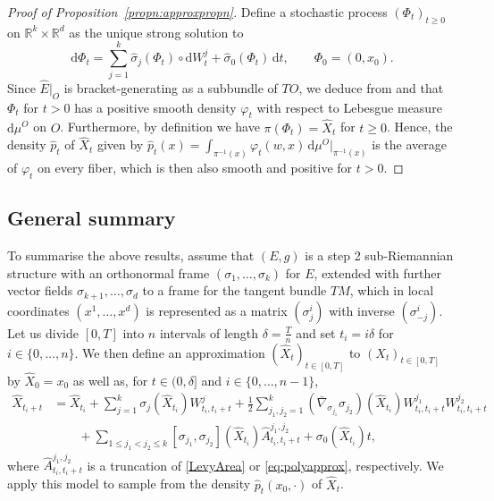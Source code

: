 \documentclass[10pt]{amsart}
\theoremstyle{remark}
\newcommand{\R}{\mathbb{R}}
\newcommand{\dd}{\,{\mathrm d}}
\newcommand{\db}{{\mathrm d}}
\numberwithin{equation}{section}
\begin{document}
\begin{proof}[Proof of Proposition~\ref{propn:approxpropn}]
Define a stochastic process $(\Phi_t)_{t\geq 0}$ on $\R^k\times\R^d$ as the unique strong solution to
$$\db\Phi_t = \sum_{j=1}^k \hat \sigma_j(\Phi_t) \circ \db W_t^j + \hat \sigma_0(\Phi_t) \dd t,\qquad \Phi_0 =(0,x_0).$$
Since $\hat E|_O$ is bracket-generating as a subbundle of $TO$, we deduce from \cite{Hor67} and \cite{StVa72} that $\Phi_t$ for $t>0$ has a positive smooth density $\varphi_t$ with respect to Lebesgue measure $\db \mu^O$ on $O$.
Furthermore, by definition we have $\pi(\Phi_t) = \hat X_t$ for $t\geq 0$. Hence, the density
$\hat p_t$ of $\hat X_t$ given by
$\hat p_t(x) = \int_{\pi^{-1}(x)} \varphi_t(w,x) \dd \mu^O|_{\pi^{-1}(x)}$ is the average of $\varphi_t$ on every fiber, which is then also smooth and positive for $t>0$.
\end{proof}

\subsection{General summary}
To summarise the above results, assume that $(E,g)$ is a step 2 sub-Riemannian structure with an orthonormal frame $(\sigma_1, \dots, \sigma_k)$ for $E$, extended with further vector fields $\sigma_{k+1}, \dots, \sigma_{d}$ to a frame for the tangent bundle $TM$, which in local coordinates $(x^1, \dots, x^d)$ is represented as a matrix $(\sigma^i_j)$ with inverse $(\sigma_{-j}^i)$. Let us divide $[0,T]$ into $n$ intervals of length $\delta = \frac{T}{n}$ and set $t_i = i \delta$ for $i\in\{0,\dots,n\}$. We then define an approximation $(\hat X_t)_{t\in[0,T]}$ to $(X_t)_{t\in[0,T]}$ by $\hat X_0 = x_0$ as well as, for $t\in(0,\delta]$ and $i\in\{0,\dots, n-1\}$,
\begin{align*}
\hat X_{t_{i} +t}  & = \hat X_{t_{i}}+ \sum_{j=1}^k \sigma_{j}(\hat X_{t_{i}}) W_{t_i,t_i+t}^j + \frac{1}{2} \sum_{j_1,j_2=1}^k  (\bar{\nabla}_{\sigma_{j_1}}\sigma_{j_2})(\hat X_{t_{i}})  W_{t_i,t_i+t}^{j_1} W_{t_i,t_i+t}^{j_2} \\
& \qquad + \sum_{1 \leq j_1 <j_2 \leq k}  [\sigma_{j_1}, \sigma_{j_2}](\hat X_{t_{i}})  \hat A^{j_1,j_2}_{t_i,t_i+t} + \sigma_0(\hat X_{t_i}) t,
\end{align*}
where $\hat A^{j_1,j_2}_{t_i,t_i+t}$ is a truncation of \eqref{LevyArea} or \eqref{eq:polyapprox}, respectively. We apply this model to sample from the density $\hat p_t(x_0,\cdot)$ of $\hat X_t$.
\end{document}
